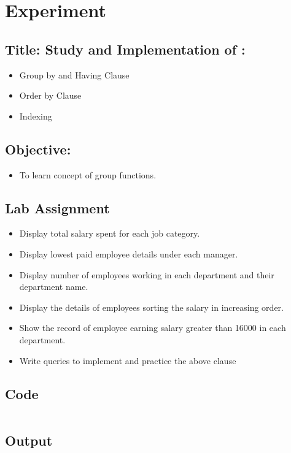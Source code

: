 \documentclass{article}
\begin{document}
\section*{Experiment \jobname}
\subsection*{\textbf{Title:} Study and Implementation of :}
\begin{itemize}
	\item Group by and Having Clause
	\item Order by Clause
	\item Indexing
\end{itemize}
\subsection*{\textbf{Objective:}}
\begin{itemize}
	\item To learn concept of group functions.
\end{itemize}
\subsection*{Lab Assignment}
\begin{itemize}
	\item Display total salary spent for each job category.
	\item Display lowest paid employee details under each manager.
	\item Display number of employees working in each department and their department name.
	\item Display the details of employees sorting the salary in increasing order.
	\item Show the record of employee earning salary greater than 16000 in each department.
	\item Write queries to implement and practice the above clause
\end{itemize}
\subsection*{Code}
\inputminted{sql}{code/\jobname.sql}
\subsection*{Output}

\end{document}
